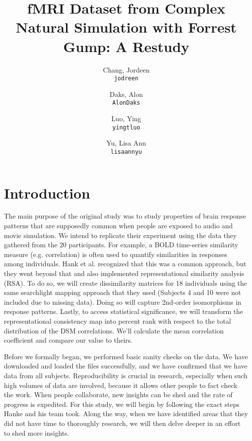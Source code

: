 \documentclass[11pt]{article}
\title{fMRI Dataset from Complex Natural Simulation with Forrest Gump: A Restudy}
\author{
  Chang, Jordeen\\
  \texttt{jodreen}
  \and
  Daks, Alon\\
  \texttt{AlonDaks}
  \and
  Luo, Ying\\
  \texttt{yingtluo}
  \and
  Yu, Lisa Ann\\
  \texttt{lisaannyu}
}
\begin{document}
\maketitle  


\section{Introduction}

The main purpose of the original study was to study properties of brain response
patterns that are supposedly common when people are exposed to audio and movie
simulation. We intend to replicate their experiment using the data they gathered
from the 20 participants. For example, a BOLD time-series similarity measure
(e.g. correlation) is often used to quantify similarities in responses among
individuals. Hank et al. recognized that this was a common approach, but they
went beyond that and also implemented representational similarity analysis 
(RSA). To do so, we will create dissimilarity matrices for 18 individuals using
the same searchlight mapping approach that they used (Subjects 4 and 10 were not
included due to missing data). Doing so will capture 2nd-order isomorphisms in
response patterns. Lastly, to access statistical significance, we will transform
the representational consistency map into percent rank with respect to the total
distribution of the DSM correlations. We'll calculate the mean correlation
coefficient and compare our value to theirs.

Before we formally began, we performed basic sanity checks on the data. We
have downloaded and loaded the files successfully, and we have confirmed that
we have data from all subjects. Reproducibility is crucial in research, especially
when such high volumes of data are involved, because it allows other people to
fact check the work. When people collaborate, new insights can be shed and the
rate of progress is expedited. For this study, we will begin by following the 
exact steps Hanke and his team took. Along the way, when we have identified areas
that they did not have time to thoroughly research, we will then delve deeper in
an effort to shed more insights.
\end{document}
